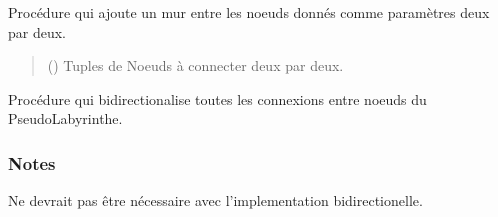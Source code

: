 \documentclass[letterpaper,10pt,french]{sphinxmanual}
\begin{document}
\begin{fulllineitems}
\begin{fulllineitems}
\begin{quote}
\begin{description}
\end{description}\end{quote}

\end{fulllineitems}


\begin{fulllineitems}
\label{\detokenize{src:src.utilites.PseudoLabyrinthe.ajoute_murs}}
\pysigstartsignatures
{}
\pysigstopsignatures
\sphinxAtStartPar
Procédure qui ajoute un mur entre les noeuds donnés comme paramètres deux par deux.
\begin{quote}\begin{description}
\sphinxAtStartPar
{} () \textendash{} Tuples de Noeuds à connecter deux par deux.

\end{description}\end{quote}

\end{fulllineitems}


\begin{fulllineitems}
\label{\detokenize{src:src.utilites.PseudoLabyrinthe.bidirectionalise}}
\pysigstartsignatures
{}
\pysigstopsignatures
\sphinxAtStartPar
Procédure qui bidirectionalise toutes les connexions entre noeuds du PseudoLabyrinthe.
\subsubsection*{Notes}

\sphinxAtStartPar
Ne devrait pas être nécessaire avec l’implementation bidirectionelle.

\end{fulllineitems}



\end{fulllineitems}
\end{document}
